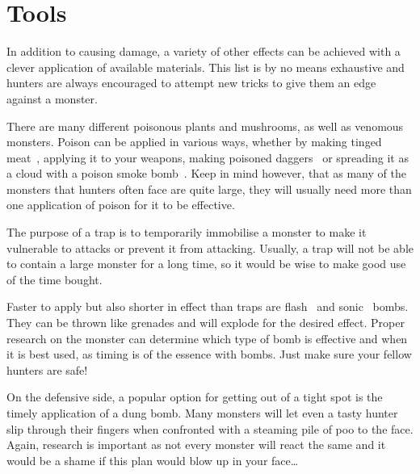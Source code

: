 \section{Tools}
In addition to causing damage, a variety of other effects can be achieved with a clever application of available materials. This list is by no means exhaustive and hunters are always encouraged to attempt new tricks to give them an edge against a monster.

There are many different poisonous plants and mushrooms, as well as venomous monsters. Poison can be applied in various ways, whether by making tinged meat~, applying it to your weapons, making poisoned daggers~ or spreading it as a cloud with a poison smoke bomb~. Keep in mind however, that as many of the monsters that hunters often face are quite large, they will usually need more than one application of poison for it to be effective.

The purpose of a trap is to temporarily immobilise a monster to make it vulnerable to attacks or prevent it from attacking. Usually, a trap will not be able to contain a large monster for a long time, so it would be wise to make good use of the time bought.

 Faster to apply but also shorter in effect than traps are flash~ and sonic~ bombs. They can be thrown like grenades and will explode for the desired effect. Proper research on the monster can determine which type of bomb is effective and when it is best used, as timing is of the essence with bombs. Just make sure your fellow hunters are safe!

On the defensive side, a popular option for getting out of a tight spot is the timely application of a dung bomb. Many monsters will let even a tasty hunter slip through their fingers when confronted with a steaming pile of poo to the face. Again, research is important as not every monster will react the same and it would be a shame if this plan would blow up in your face\ldots

